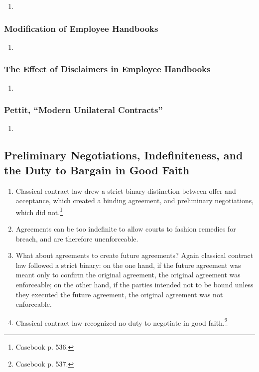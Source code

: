 \begin{enumerate}
    \item %
\end{enumerate}

\subsubsection{Modification of Employee Handbooks}

\begin{enumerate}
    \item %
\end{enumerate}

\subsubsection{The Effect of Disclaimers in Employee Handbooks}

\begin{enumerate}
    \item %
\end{enumerate}

\subsubsection{Pettit, ``Modern Unilateral Contracts''}

\begin{enumerate}
    \item %
\end{enumerate}

\subsection{Preliminary Negotiations, Indefiniteness, and the Duty to Bargain 
in Good Faith}

\begin{enumerate}
    \item Classical contract law drew a strict binary distinction between 
    offer and acceptance, which created a binding agreement, and preliminary 
    negotiations, which did not.\footnote{Casebook p. 536.}
    \item Agreements can be too indefinite to allow courts to fashion 
    remedies for breach, and are therefore unenforceable.
    \item What about agreements to create future agreements? Again classical 
    contract law followed a strict binary: on the one hand, if the future
    agreement was meant only to confirm the original agreement, the original 
    agreement was enforceable; on the other hand, if the parties intended not 
    to be bound unless they executed the future agreement, the original 
    agreement was not enforceable.
    \item Classical contract law recognized no duty to negotiate in good 
    faith.\footnote{Casebook p. 537.}
\end{enumerate}

